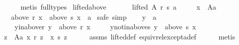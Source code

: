 \begin{isabellebody}
\ \ \ \ \isamarkupfalse%
\ {\isacharparenleft}{\kern0pt}metis\ {\isacharparenleft}{\kern0pt}full{\isacharunderscore}{\kern0pt}types{\isacharparenright}{\kern0pt}{\isacharparenright}{\kern0pt}\isanewline
{}\isamarkupfalse%
%
\endisatagproof
{\isafoldproof}%
%
\isadelimproof
\isanewline
%
\endisadelimproof
\isanewline
{}\isamarkupfalse%
\ lifted{\isacharunderscore}{\kern0pt}above{}{\isacharcolon}{\kern0pt}\isanewline
\ \ \isanewline
\ \ \ \ {\isachardoublequoteopen}lifted\ A\ r\ s\ a{\isachardoublequoteclose}\ \isanewline
\ \ \ \ {\isachardoublequoteopen}x\ {\isasymin}\ A{\isacharminus}{\kern0pt}{\isacharbraceleft}{\kern0pt}a{\isacharbraceright}{\kern0pt}{\isachardoublequoteclose}\isanewline
\ \ \ {\isachardoublequoteopen}above\ r\ x\ {\isasymsubseteq}\ above\ s\ x\ {\isasymunion}\ {\isacharbraceleft}{\kern0pt}a{\isacharbraceright}{\kern0pt}{\isachardoublequoteclose}\isanewline
%
\isadelimproof
%
\endisadelimproof
%
\isatagproof
{}\isamarkupfalse%
\ {\isacharparenleft}{\kern0pt}safe{\isacharcomma}{\kern0pt}\ simp{\isacharparenright}{\kern0pt}\isanewline
\ \ \isamarkupfalse%
\ y\ {\isacharcolon}{\kern0pt}{\isacharcolon}{\kern0pt}\ {\isachardoublequoteopen}{\isacharprime}{\kern0pt}a{\isachardoublequoteclose}\isanewline
\ \ \isamarkupfalse%
\isanewline
\ \ \ \ y{\isacharunderscore}{\kern0pt}in{\isacharunderscore}{\kern0pt}above{\isacharunderscore}{\kern0pt}r{\isacharcolon}{\kern0pt}\ {\isachardoublequoteopen}y\ {\isasymin}\ above\ r\ x{\isachardoublequoteclose}\ \isanewline
\ \ \ \ y{\isacharunderscore}{\kern0pt}not{\isacharunderscore}{\kern0pt}in{\isacharunderscore}{\kern0pt}above{\isacharunderscore}{\kern0pt}s{\isacharcolon}{\kern0pt}\ {\isachardoublequoteopen}y\ {\isasymnotin}\ above\ s\ x{\isachardoublequoteclose}\isanewline
\ \ \isamarkupfalse%
\ {\isachardoublequoteopen}{\isasymforall}z\ {\isasymin}\ A{\isacharminus}{\kern0pt}{\isacharbraceleft}{\kern0pt}a{\isacharbraceright}{\kern0pt}{\isachardot}{\kern0pt}\ x\ {\isasympreceq}\isactrlsub r\ z\ {\isasymlongleftrightarrow}\ x\ {\isasympreceq}\isactrlsub s\ z{\isachardoublequoteclose}\isanewline
\ \ \ \ \isamarkupfalse%
\ assms\ lifted{\isacharunderscore}{\kern0pt}def\ equiv{\isacharunderscore}{\kern0pt}rel{\isacharunderscore}{\kern0pt}except{\isacharunderscore}{\kern0pt}a{\isacharunderscore}{\kern0pt}def\isanewline
\ \ \ \ \isamarkupfalse%
\ metis\isanewline
\ \ \isamarkupfalse%

\end{isabellebody}
